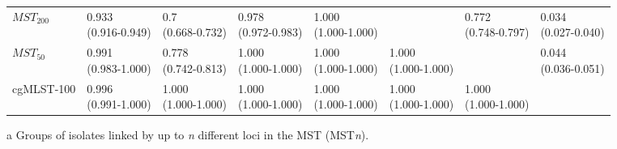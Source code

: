 \begin{table}[h!]
{\begin{threeparttable}[b]
\begin{tabular}{@{}llllllll@{}}
        $MST_{200}$\tnote{a} & \Centerstack{0.933 \\ (0.916-0.949)} & \Centerstack{0.7 \\ (0.668-0.732)} & \Centerstack{0.978 \\ (0.972-0.983)} & \Centerstack{1.000 \\ (1.000-1.000)} & & \Centerstack{0.772 \\ (0.748-0.797)} & \Centerstack{0.034 \\ (0.027-0.040)} \\
        $MST_{50}$\tnote{a} & \Centerstack{0.991 \\ (0.983-1.000)} & \Centerstack{0.778 \\ (0.742-0.813)} & \Centerstack{1.000 \\ (1.000-1.000)} & \Centerstack{1.000 \\ (1.000-1.000)} & \Centerstack{1.000 \\ (1.000-1.000)} & & \Centerstack{0.044 \\ (0.036-0.051)} \\
        cgMLST-100 & \Centerstack{0.996 \\ (0.991-1.000)} & \Centerstack{1.000 \\ (1.000-1.000)} & \Centerstack{1.000 \\ (1.000-1.000)} & \Centerstack{1.000 \\ (1.000-1.000)} & \Centerstack{1.000 \\ (1.000-1.000)} & \Centerstack{1.000 \\ (1.000-1.000)} & \\
        \bottomrule
    \end{tabular}
    \begin{tablenotes}
       \item [a] {\footnotesize Groups of isolates linked by up to \textit{n} different loci in the MST (MST\textit{n}).}
    \end{tablenotes}
    \end{threeparttable}
    }
\end{table}
